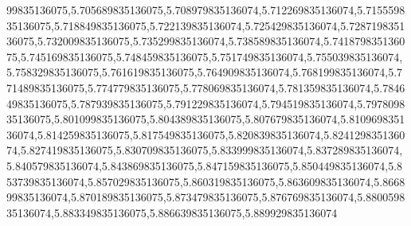 99835136075,5.705689835136075,5.708979835136074,5.712269835136074,5.715559835136075,5.718849835136075,5.722139835136074,5.725429835136074,5.728719835136075,5.732009835136075,5.735299835136074,5.738589835136074,5.741879835136075,5.745169835136075,5.748459835136075,5.751749835136074,5.755039835136074,5.758329835136075,5.761619835136075,5.764909835136074,5.768199835136074,5.771489835136075,5.774779835136075,5.778069835136074,5.781359835136074,5.784649835136075,5.787939835136075,5.791229835136074,5.794519835136074,5.797809835136075,5.801099835136075,5.804389835136075,5.807679835136074,5.810969835136074,5.814259835136075,5.817549835136075,5.820839835136074,5.824129835136074,5.827419835136075,5.830709835136075,5.833999835136074,5.837289835136074,5.840579835136074,5.843869835136075,5.847159835136075,5.850449835136074,5.853739835136074,5.857029835136075,5.860319835136075,5.863609835136074,5.866899835136074,5.870189835136075,5.873479835136075,5.876769835136074,5.880059835136074,5.883349835136075,5.886639835136075,5.889929835136074

